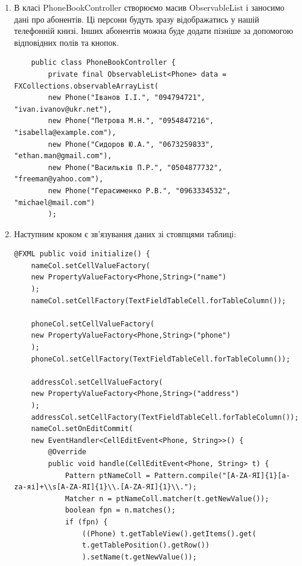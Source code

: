 \begin{enumerate}
\begin{verbatim}
	Phone(String name, String phone, String address) {
		this.name = new SimpleStringProperty(name);
		this.phone = new SimpleStringProperty(phone);
		this.address = new SimpleStringProperty(address);
	}
	public String getName() {
		return name.get();
	}
	public void setName(String name) {
		this.name.set(name);
	}
	public String getPhone() {
		return phone.get();
	}
	public void setPhone(String phone) {
		this.phone.set(phone);
	}
	public String getAddress() {
		return address.get();
	}
	public void setAddress(String address) {
		this.address.set(address);
	}
\end{verbatim}
	Об’єкти name, phone, address створені для ввімкнення посилання на певний елемент даних таблиці. Крім того, для кожного елемента даних передбачені get та set методи .
	\item В класі PhoneBookController створюємо масив ObservableList і заносимо дані про абонентів. Ці персони будуть зразу відображатись у нашій телефонній книзі. Інших абонентів можна буде додати пізніше за допомогою відповідних полів та кнопок.
\begin{verbatim}		
	public class PhoneBookController {
		private final ObservableList<Phone> data = FXCollections.observableArrayList(
		new Phone("Іванов І.І.", "094794721", "ivan.ivanov@ukr.net"),
		new Phone("Петрова М.Н.", "0954847216", "isabella@example.com"),
		new Phone("Сидоров Ю.А.", "0673259833", "ethan.man@gmail.com"),
		new Phone("Васильків П.Р.", "0504877732", "freeman@yahoo.com"),
		new Phone("Герасименко Р.В.", "0963334532", "michael@mail.com")
		);
\end{verbatim}
	\item Наступним кроком є зв’язування даних зі стовпцями таблиці:
\begin{verbatim}
@FXML public void initialize() {
	nameCol.setCellValueFactory(
	new PropertyValueFactory<Phone,String>("name")
	);
	nameCol.setCellFactory(TextFieldTableCell.forTableColumn());
	
	phoneCol.setCellValueFactory(
	new PropertyValueFactory<Phone,String>("phone")
	);
	phoneCol.setCellFactory(TextFieldTableCell.forTableColumn());
	
	addressCol.setCellValueFactory(
	new PropertyValueFactory<Phone,String>("address")
	);
	addressCol.setCellFactory(TextFieldTableCell.forTableColumn());
	nameCol.setOnEditCommit(
	new EventHandler<CellEditEvent<Phone, String>>() {
		@Override
		public void handle(CellEditEvent<Phone, String> t) {
			Pattern ptNameColl = Pattern.compile("[A-ZА-ЯІ]{1}[a-zа-яі]+\\s[A-ZА-ЯІ]{1}\\.[A-ZА-ЯІ]{1}\\.");
			Matcher n = ptNameColl.matcher(t.getNewValue());
			boolean fpn = n.matches();
			if (fpn) {
				((Phone) t.getTableView().getItems().get(
				t.getTablePosition().getRow())
				).setName(t.getNewValue());
				

\end{verbatim}
\end{enumerate}
